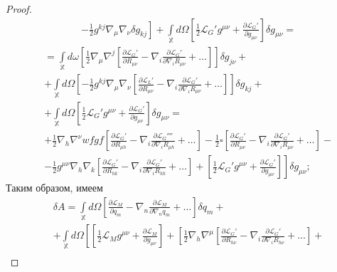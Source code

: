 \documentclass[a4paper, 14pt]{scrarticle}
\theoremstyle{Imperial}
\begin{document}
\begin{proof}
$$\begin{aligned}
			&\left. - \frac{1}{2}g^{kj}\nabla_{\mu}\nabla_{\nu}\delta g_{kj} \right] + \int\limits_\mathbb{X} d\Omega \left[ \frac{1}{2} \mathcal{L}_G' g^{\mu\nu} + \frac{\partial\mathcal{L}_G'}{\partial g_{\mu\nu}} \right] \delta g_{\mu\nu} =
		\end{aligned}$$
		$$\begin{aligned}
			&= \int\limits_\mathbb{X} d\omega \left[ \frac{1}{2} \nabla_{\mu}\nabla^{j} \left[ \frac{\partial \mathcal{L}_G'}{\partial R_{\mu\nu}} - \nabla_i \frac{\partial \mathcal{L}_G'}{\partial \nabla_i R_{\mu\nu}} + \dots \right] \right] \delta g_{j\nu} +\\ 
			&+ \int\limits_\mathbb{X} d\Omega \left[ - \frac{1}{2}g^{kj}\nabla_{\mu}\nabla_{\nu} \left[ \frac{\partial \mathcal{L}_L'}{\partial R_{\mu\nu}} - \nabla_i \frac{\partial \mathcal{L}_G'}{\partial \nabla_i R_{\mu\nu}} + \dots \right] \right] \delta g_{kj} +\\
			&+ \int\limits_\mathbb{X} d\Omega \left[ \frac{1}{2} \mathcal{L}_G' g^{\mu\nu} + \frac{\partial\mathcal{L}_G'}{\partial g_{\mu\nu}} \right] \delta g_{\mu\nu}=\\
			&+ \frac{1}{2} \nabla_{h} \nabla^{\nu}wfgf \left[ \frac{\partial \mathcal{L}_G'}{\partial R_{\mu h}} - \nabla_i \frac{\partial \mathcal{L}_G''''}{\partial \nabla_i R_{\mu h}} + \dots \right] -\frac{1}{2}\square \left[ \frac{\partial \mathcal{L}_G'}{\partial R_{\mu\nu}} - \nabla_i \frac{\partial \mathcal{L}_G'}{\partial \nabla_i R_{\mu\nu}} + \dots \right] - \\
			&\left. - \frac{1}{2}g^{\mu\nu}\nabla_{h}\nabla_{k} \left[ \frac{\partial \mathcal{L}_G'}{\partial R_{hk}} - \nabla_i \frac{\partial \mathcal{L}_G'}{\partial \nabla_i R_{hk}} + \dots \right] + \left[ \frac{1}{2} \mathcal{L}_G' g^{\mu\nu} + \frac{\partial\mathcal{L}_G'}{\partial g_{\mu\nu}} \right] \right] \delta g_{\mu\nu}; 
		\end{aligned}$$
		Таким образом, имеем
		$$\begin{aligned}
			&\delta A = \int\limits_\mathbb{X} d\Omega \left[ \frac{\partial \mathcal{L}_M}{\partial q_m} - \nabla_n \frac{\partial \mathcal{L}_M}{\partial \nabla_n q_m} + \dots \right] \delta q_m +\\ 
			&+ \int\limits_\mathbb{X} d\Omega \left[ \left[  \frac{1}{2} \mathcal{L}_M g^{\mu\nu} + \frac{\partial\mathcal{L}_M}{\partial g_{\mu\nu}} \right] + \left[ \frac{1}{2} \nabla_{h}\nabla^{\mu} \left[ \frac{\partial \mathcal{L}_G'}{\partial R_{h\nu}} - \nabla_i \frac{\partial \mathcal{L}_G'}{\partial \nabla_i R_{h\nu}} + \dots \right] \right. \right. +\\ 

\end{aligned}$$
\end{proof}
\end{document}
